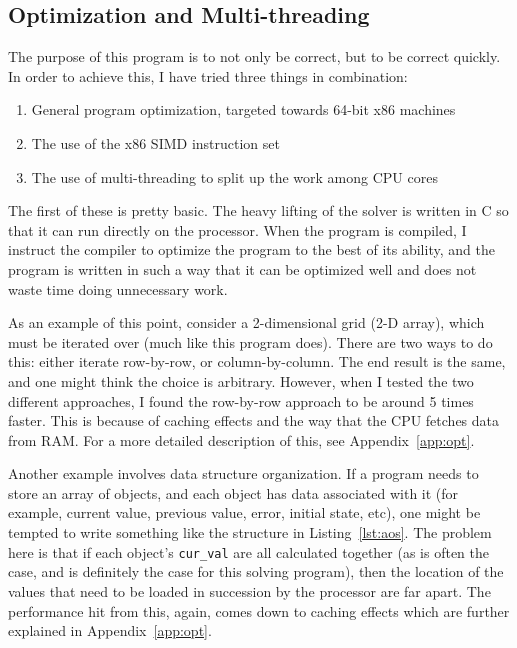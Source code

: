 \subsection{Optimization and Multi-threading}
\label{sec:opt-mul}
The purpose of this program is to not only be correct, but to be correct quickly. In order to achieve this, I have
tried three things in combination:
\begin{enumerate}
\item General program optimization, targeted towards 64-bit x86 machines
\item The use of the x86 SIMD instruction set
\item The use of multi-threading to split up the work among CPU cores
\end{enumerate}
The first of these is pretty basic. The heavy lifting of the solver is written in C so that it can run directly on the
processor. When the program is compiled, I instruct the compiler to optimize the program to the best of its ability,
and the program is written in such a way that it can be optimized well and does not waste time doing unnecessary work.

As an example of this point, consider a 2-dimensional grid (2-D array), which must be iterated over (much like
this program does). There are two ways to do this: either iterate row-by-row, or column-by-column. The end result is
the same, and one might think the choice is arbitrary. However, when I tested the two different approaches, I found
the row-by-row approach to be around 5 times faster. This is because of caching effects and the way that the CPU
fetches data from RAM\cite{intel-1}. For a more detailed description of this, see Appendix~\ref{app:opt}.

Another example involves data structure organization. If a program needs to store an array of objects, and each object
has data associated with it (for example, current value, previous value, error, initial state, etc), one might be tempted
to write something like the structure in Listing~\ref{lst:aos}. The problem here is that if each object's \texttt{cur\_val} are all
calculated together (as is often the case, and is definitely the case for this solving program), then the location of
the values that need to be loaded in succession by the processor are far apart. The performance hit from this, again, comes down to caching
effects which are further explained in Appendix~\ref{app:opt}.

\vspace{5mm}

